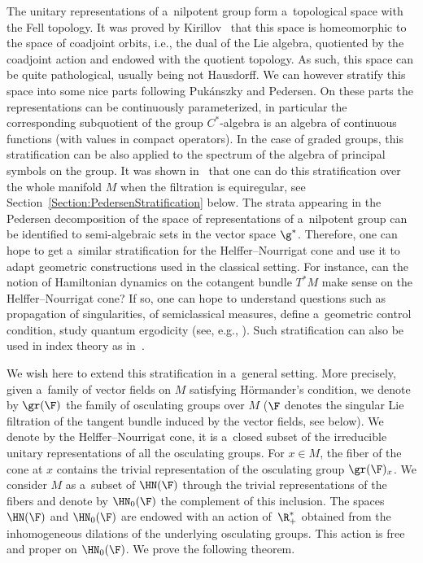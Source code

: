 The unitary representations of a~nilpotent group form a~topological space with the Fell topology. It was proved by Kirillov~\cite{Kirillov} that this space is homeomorphic to the space of coadjoint orbits, i.e., the dual of the Lie algebra, quotiented by the coadjoint action and endowed with the quotient topology. As such, this space can be quite pathological, usually being not Hausdorff. We can however stratify this space into some nice parts following Puk\'anszky and Pedersen. On these parts the representations can be continuously parameterized, in particular the corresponding subquotient of the group $C^*$-algebra is an algebra of continuous functions (with values in compact operators). In the case of graded groups, this stratification can be also applied to the spectrum of the algebra of principal symbols on the group. It was shown in~\cite{CrenFilteredCrossedProduct} that one can do this stratification over the whole manifold $M$ when the filtration is equiregular, see Section~\ref{Section:PedersenStratification} below. The strata appearing in the Pedersen decomposition of the space of representations of a~nilpotent group can be identified to semi-algebraic sets in the vector space $\g^*$. Therefore, one can hope to get a~similar stratification for the Helffer--Nourrigat cone and use it to adapt geometric constructions used in the classical setting. For instance, can the notion of Hamiltonian dynamics on the cotangent bundle $T^*M$ make sense on the Helffer--Nourrigat cone? If so, one can hope to understand questions such as propagation of singularities, of semiclassical measures, define a~geometric control condition, study quantum ergodicity (see, e.g., \cite{benedetto}). Such stratification can also be used in index theory as in~\cite{GoffengKuzmin}.

We wish here to extend this stratification in a~general setting. More precisely, given a~family of vector fields on $M$ satisfying H\"ormander's condition, we denote by $\gr(\F)$ the family of osculating groups over $M$ ($\F$ denotes the singular Lie filtration of the tangent bundle induced by the vector fields, see below). We denote by \smash{$\HN(\F) \subset \widehat{\gr(\F)}$} the Helffer--Nourrigat cone, it is a~closed subset of the irreducible unitary representations of all the osculating groups. For $x \in M$, the fiber of the cone at $x$ contains the trivial representation of the osculating group $\gr(\F)_x$. We consider $M$ as a~subset of $\HN(\F)$ through the trivial representations of the fibers and denote by $\HN_0(\F)$ the complement of this inclusion. The spaces $\HN( \F)$ and $\HN_0(\F)$ are endowed with an action of~$\R^*_+$ obtained from the inhomogeneous dilations of the underlying osculating groups. This action is free and proper on $\HN_0(\F)$. We prove the following theorem.


